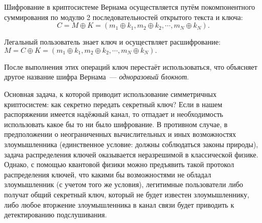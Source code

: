 Шифрование в криптосистеме Вернама осуществляется путём покомпонентного суммирования по модулю 2 последовательностей открытого текста и ключа:
$$C = M \oplus K = (m_1 \oplus k_1, m_2 \oplus k_2, \cdots, m_N \oplus k_N ).$$

Легальный пользователь знает ключ и осуществляет расшифрование:
$M = C \oplus K = (m_1 \oplus k_1, m_2 \oplus k_2, \cdots, m_N \oplus k_N ).$

После выполнения этих операций ключ перестаёт использоваться, что объясняет другое название шифра Вернама~--- \textit{одноразовый блокнот}. 

Основная задача, к которой приводит использование симметричных криптосистем: как секретно передать секретный ключ?
Если в нашем распоряжении имеется надёжный канал, то отпадает и необходимость использовать какое бы то ни было шифрование.
В противном случае, в предположении о неограниченных вычислительных и иных возможностях злоумышленника (единственное условие: должны соблюдаться законы природы),
задача распределения ключей оказывается неразрешимой в классической физике. Однако, с помощью квантовой физики можно предъявить такой протокол распределения ключей, 
что какими бы возможностями не обладал злоумышленник (с учетом того же условия), легитимные пользователи либо получат общий секретный ключ, который не будет известен злоумышленнику,
либо любое вторжение злоумышленника в канал связи будет приводить к детектированию подслушивания.